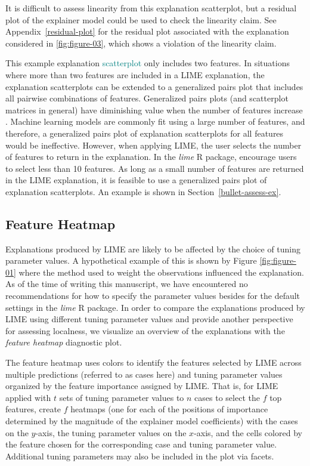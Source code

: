 \documentclass[AMS,STIX2COL]{WileyNJD-v2}\usepackage[]{graphicx}\usepackage[]{color}
\newcommand{\kge}[1]{\textcolor{teal}{#1}}
\renewcommand{\sout}[1]{\unskip}
\begin{document}
It is difficult to assess linearity from this explanation scatterplot, but a residual plot of the explainer model could be used to check the linearity claim. See Appendix~\ref{residual-plot} for the residual plot associated with the explanation considered in \autoref{fig:figure-03}, which shows a violation of the linearity claim.

This example explanation \kge{scatterplot} only includes two features. In situations where more than two features are included in a LIME explanation, the explanation scatterplots can be extended to a generalized pairs plot \citep{emerson:2013} that includes all pairwise combinations of features. Generalized pairs plots (and scatterplot matrices in general) have diminishing value when the number of features increase \citep{jensen:2011} \citep{sweller:2011}. Machine learning models are commonly fit using a large number of features, and therefore, a generalized pairs plot of explanation scatterplots for all features would be ineffective. However, when applying LIME, the user selects the number of features to return in the explanation. In the \emph{lime} R package, \citet{pedersen:2020} encourage users to select less than 10 features. As long as a small number of features are returned in the LIME explanation, it is feasible to use a generalized pairs plot of explanation scatterplots. An example is shown in Section~\ref{bullet-assess-ex}.

\subsection{Feature Heatmap} \label{feat-heat}

Explanations produced by LIME are likely to be affected by the choice of tuning parameter values. A hypothetical example of this is shown by Figure\sout{s} \ref{fig:figure-01} \sout{and \ref{fig:figure-02} }where the method used to weight the observations influenced the explanation. As of the time of writing this manuscript, we have encountered no recommendations for how to specify the parameter values besides for the default settings in the \emph{lime} R package. In order to compare the explanations produced by LIME using different tuning parameter values and provide another perspective for assessing localness, we visualize an overview of the explanations with the \emph{feature heatmap} diagnostic plot. 

The feature heatmap uses colors to identify the features selected by LIME across multiple predictions (referred to as cases here) and tuning parameter values organized by the feature importance assigned by LIME. That is, for LIME applied with $t$ sets of tuning parameter values to $n$ cases to select the $f$ top features, create $f$ heatmaps (one for each of the positions of importance determined by the magnitude of the explainer model coefficients) with the cases on the $y$-axis, the tuning parameter values on the $x$-axis, and the cells colored by the feature chosen for the corresponding case and tuning parameter value. Additional tuning parameters may also be included in the plot via facets. 
\end{document}
